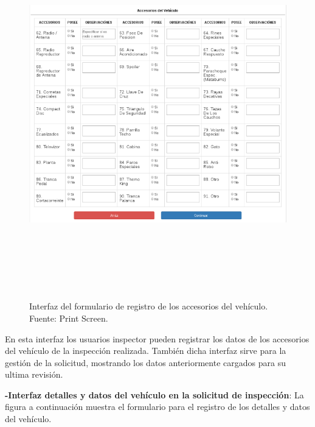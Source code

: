 \begin{figure}[H]
\begin{center}
	\includegraphics[width=\textwidth,height=16cm]{img/interfaces/registro_accesorios_vehiculo.png}
\end{center}
\caption{Interfaz del formulario de registro de los accesorios del vehículo. Fuente: Print Screen.}
\label{fig:interfaz_registro_accesorios_vehiculo}
\end{figure}

En esta interfaz los usuarios inspector pueden registrar los datos de los accesorios del vehículo de la inspección realizada. También dicha interfaz sirve para la gestión de la solicitud, mostrando los datos anteriormente cargados para su ultima revisión.


\textbf{-Interfaz detalles y datos del vehículo en la solicitud de inspección}: La figura a continuación muestra el formulario para el registro de los detalles y datos del vehículo.

